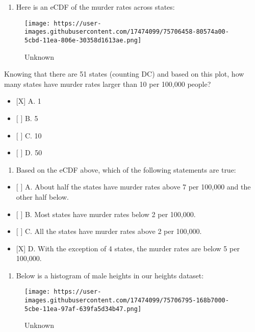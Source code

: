 \documentclass[]{article}
\providecommand{\tightlist}{%
  \setlength{\itemsep}{0pt}\setlength{\parskip}{0pt}}
\begin{document}
\begin{enumerate}
\def\labelenumi{\arabic{enumi}.}
\setcounter{enumi}{4}
\tightlist
\item
  Here is an eCDF of the murder rates across states:
\end{enumerate}

\begin{figure}
\centering
\texttt{[image: https://user-images.githubusercontent.com/17474099/75706458-80574a00-5cbd-11ea-806e-30358d1613ae.png]}
\caption{Unknown}
\end{figure}

Knowing that there are 51 states (counting DC) and based on this plot,
how many states have murder rates larger than 10 per 100,000 people?

\begin{itemize}
\tightlist
\item
  {[}X{]} A. 1
\item
  {[} {]} B. 5
\item
  {[} {]} C. 10
\item
  {[} {]} D. 50
\end{itemize}

\begin{enumerate}
\def\labelenumi{\arabic{enumi}.}
\setcounter{enumi}{5}
\tightlist
\item
  Based on the eCDF above, which of the following statements are true:
\end{enumerate}

\begin{itemize}
\tightlist
\item
  {[} {]} A. About half the states have murder rates above 7 per 100,000
  and the other half below.
\item
  {[} {]} B. Most states have murder rates below 2 per 100,000.
\item
  {[} {]} C. All the states have murder rates above 2 per 100,000.
\item
  {[}X{]} D. With the exception of 4 states, the murder rates are below
  5 per 100,000.
\end{itemize}

\begin{enumerate}
\def\labelenumi{\arabic{enumi}.}
\setcounter{enumi}{6}
\tightlist
\item
  Below is a histogram of male heights in our heights dataset:
\end{enumerate}

\begin{figure}
\centering
\texttt{[image: https://user-images.githubusercontent.com/17474099/75706795-168b7000-5cbe-11ea-97af-639fa5d34b47.png]}
\caption{Unknown}
\end{figure}
\end{document}
